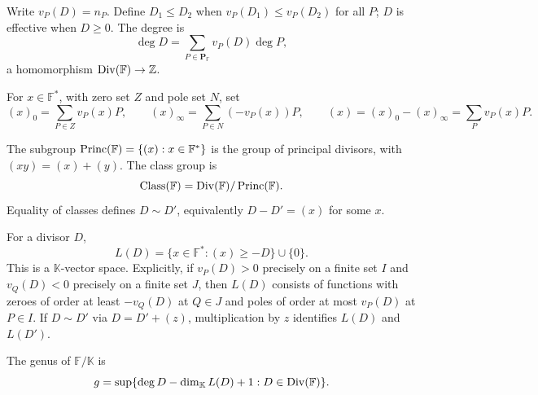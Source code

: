 \begin{definition}
\label{par-def-divisor-degree}
\uses{}
Write $v_P(D)=n_P$. Define $D_1\leq D_2$ when
$v_P(D_1)\leq v_P(D_2)$ for all $P$; $D$ is effective when $D\geq0$. The degree is
\[
\deg D=\sum_{P\in\mathbf P_{\mathbb F}}v_P(D)\deg P,
\]
a homomorphism $\operatorname{Div}(\mathbb F)\to\mathbb Z$.
\end{definition}

\begin{definition}
\label{par-def-principal-divisor}
\uses{}
For $x\in\mathbb F^*$, with zero set $Z$ and pole set $N$, set
\[
(x)_0=\sum_{P\in Z}v_P(x)P,\qquad
(x)_\infty=\sum_{P\in N}(-v_P(x))P,\qquad
(x)=(x)_0-(x)_\infty=\sum_Pv_P(x)P.
\]
\end{definition}

\begin{definition}
\label{par-def-class-group}
\uses{}
The subgroup $\operatorname{Princ}(\mathbb F)=\{(x):x\in\mathbb F^*\}$ is the group of
principal divisors, with $(xy)=(x)+(y)$. The class group is
\[
\operatorname{Class}(\mathbb F)=\operatorname{Div}(\mathbb F)/\operatorname{Princ}(\mathbb F).
\]
Equality of classes defines $D\sim D'$, equivalently $D-D'=(x)$ for some $x$.
\end{definition}

\begin{definition}
\label{par-def-L-space}
\uses{}
For a divisor $D$,
\[
L(D)=\{x\in\mathbb F^*:(x)\geq-D\}\cup\{0\}.
\]
This is a $\mathbb K$-vector space. Explicitly, if $v_P(D)>0$ precisely on a finite set
$I$ and $v_Q(D)<0$ precisely on a finite set $J$, then $L(D)$ consists of
functions with zeroes of order at least $-v_Q(D)$ at $Q\in J$ and poles of order
at most $v_P(D)$ at $P\in I$. If $D\sim D'$ via $D=D'+(z)$, multiplication by
$z$ identifies $L(D)$ and $L(D')$.
\end{definition}

\begin{definition}[Genus]
\label{par-def-genus}
\uses{}
The genus of $\mathbb F/\mathbb K$ is
\[
g=\sup\{\deg D-\dim_{\mathbb K}L(D)+1:D\in\operatorname{Div}(\mathbb F)\}.
\]
\end{definition}

